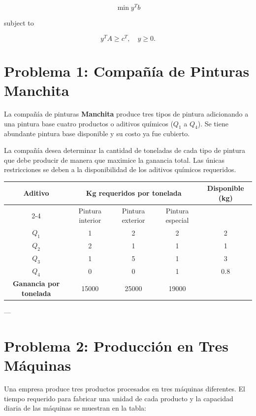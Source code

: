 \documentclass[12pt]{article}
\begin{document}
\[
\min y^T b
\]

subject to

\[
y^T A \ge c^T,
\quad
y \ge 0.
\]


\section*{Problema 1: Compañía de Pinturas Manchita}

La compañía de pinturas \textbf{Manchita} produce tres tipos de pintura adicionando a una pintura base cuatro productos o aditivos químicos ($Q_1$ a $Q_4$). Se tiene abundante pintura base disponible y su costo ya fue cubierto.

La compañía desea determinar la cantidad de toneladas de cada tipo de pintura que debe producir de manera que maximice la ganancia total. Las únicas restricciones se deben a la disponibilidad de los aditivos químicos requeridos.

\begin{center}
\begin{tabular}{|c|c|c|c|c|}
\hline
\textbf{Aditivo} & \multicolumn{3}{c|}{\textbf{Kg requeridos por tonelada}} & \textbf{Disponible (kg)} \\
\cline{2-4}
 & Pintura interior & Pintura exterior & Pintura especial & \\
\hline
$Q_1$ & 1 & 2 & 2 & 2 \\
$Q_2$ & 2 & 1 & 1 & 1 \\
$Q_3$ & 1 & 5 & 1 & 3 \\
$Q_4$ & 0 & 0 & 1 & 0.8 \\
\hline
\textbf{Ganancia por tonelada} & 15000 & 25000 & 19000 & \\
\hline
\end{tabular}
\end{center}

---

\section*{Problema 2: Producción en Tres Máquinas}

Una empresa produce tres productos procesados en tres máquinas diferentes. El tiempo requerido para fabricar una unidad de cada producto y la capacidad diaria de las máquinas se muestran en la tabla:
\end{document}
